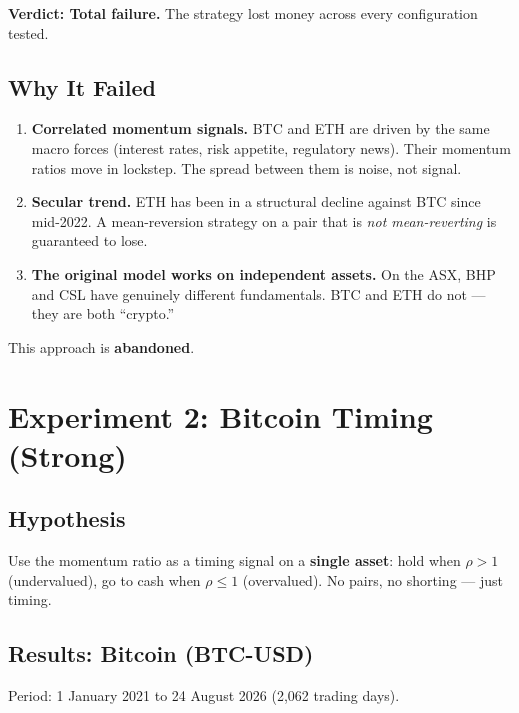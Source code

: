 \documentclass[11pt,a4paper]{article}
\begin{document}
\vspace{0.5em}
\textbf{Verdict: Total failure.} The strategy lost money across every
configuration tested.

\subsection{Why It Failed}

\begin{enumerate}[leftmargin=2em]
    \item \textbf{Correlated momentum signals.} BTC and ETH are driven
          by the same macro forces (interest rates, risk appetite,
          regulatory news). Their momentum ratios move in lockstep.
          The spread between them is noise, not signal.

    \item \textbf{Secular trend.} ETH has been in a structural decline
          against BTC since mid-2022. A mean-reversion strategy on a
          pair that is \emph{not mean-reverting} is guaranteed to lose.

    \item \textbf{The original model works on independent assets.}
          On the ASX, BHP and CSL have genuinely different fundamentals.
          BTC and ETH do not --- they are both ``crypto.''
\end{enumerate}

This approach is \textbf{abandoned}.

\section{Experiment 2: Bitcoin Timing (Strong)}

\subsection{Hypothesis}

Use the momentum ratio as a timing signal on a \textbf{single asset}:
hold when $\rho > 1$ (undervalued), go to cash when
$\rho \leq 1$ (overvalued). No pairs, no shorting --- just timing.

\subsection{Results: Bitcoin (BTC-USD)}

Period: 1 January 2021 to 24 August 2026 (2,062 trading days).
\end{document}
